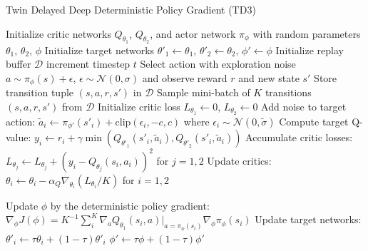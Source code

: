 \begin{algorithm}[H]
\caption{Twin Delayed Deep Deterministic Policy Gradient (TD3)}
\begin{algorithmic}[1]
\State Initialize critic networks $Q_{\theta_1}$, $Q_{\theta_2}$, and actor network $\pi_{\phi}$ with random parameters $\theta_1$, $\theta_2$, $\phi$
\State Initialize target networks $\theta'_1 \leftarrow \theta_1$, $\theta'_2 \leftarrow \theta_2$, $\phi' \leftarrow \phi$
\State Initialize replay buffer $\mathcal{D}$
\Repeat
    \State increment timestep $t$
    \State Select action with exploration noise $a \sim \pi_{\phi}(s) + \epsilon$, $\epsilon \sim \mathcal{N}(0, \sigma)$ and observe reward $r$ and new state $s'$
    \State Store transition tuple $(s, a, r, s')$ in $\mathcal{D}$
    \State Sample mini-batch of $K$ transitions $(s, a, r, s')$ from $\mathcal{D}$
    \State Initialize critic loss $L_{\theta_1} \leftarrow 0$, $L_{\theta_2} \leftarrow 0$
        \State Add noise to target action: $\tilde{a}_i \leftarrow \pi_{\phi'}(s'_i) + \text{clip}(\epsilon_i, -c, c)$ where $\epsilon_i \sim \mathcal{N}(0, \tilde{\sigma})$
        \State Compute target Q-value: $y_i \leftarrow r_i + \gamma \min(Q_{\theta'_1}(s'_i, \tilde{a}_i), Q_{\theta'_2}(s'_i, \tilde{a}_i))$
        \State Accumulate critic losses: $L_{\theta_j} \leftarrow L_{\theta_j} + (y_i - Q_{\theta_j}(s_i, a_i))^2$ for $j = 1, 2$
    \EndFor
    \State Update critics: $\theta_i \leftarrow \theta_i - \alpha_Q \nabla_{\theta_i}(L_{\theta_i}/K)$ for $i = 1, 2$

        \State Update $\phi$ by the deterministic policy gradient:
        \State $\nabla_{\phi}J(\phi) = K^{-1} \sum_{i}^{K} \nabla_a Q_{\theta_1}(s_i, a)|_{a=\pi_{\phi}(s_i)} \nabla_{\phi}\pi_{\phi}(s_i)$
        \State Update target networks:
        \State $\theta'_i \leftarrow \tau\theta_i + (1 - \tau)\theta'_i$
        \State $\phi' \leftarrow \tau\phi + (1 - \tau)\phi'$
    \EndIf
{}
\end{algorithmic}
\end{algorithm}

